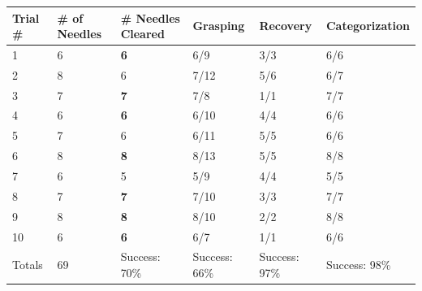 \begin{table}[ht!]\footnotesize
\centering
\label{big-experiment}
\begin{tabular}{l|l|l|l|l|l|}
{Trial \#} & { \# of Needles} & { \# Needles Cleared} & { Grasping} & { Recovery} & { Categorization} \\
\hline
1                               & 6                                    & {\color[HTML]{32CB00} \textbf{6}}         & 6/9                             & 3/3                             & 6/6                                   \\
2                               & 8                                    & 6                                         & 7/12                            & 5/6                             & 6/7                                   \\
3                               & 7                                    & {\color[HTML]{32CB00} \textbf{7}}         & 7/8                             & 1/1                             & 7/7                                   \\
4                               & 6                                    & {\color[HTML]{32CB00} \textbf{6}}         & 6/10                            & 4/4                             & 6/6                                   \\
5                               & 7                                    & 6                                         & 6/11                            & 5/5                             & 6/6                                   \\
6                               & 8                                    & {\color[HTML]{32CB00} \textbf{8}}         & 8/13                            & 5/5                             & 8/8                                   \\
7                               & 6                                    & 5                                         & 5/9                             & 4/4                             & 5/5                                   \\
8                               & 7                                    & {\color[HTML]{32CB00} \textbf{7}}         & 7/10                            & 3/3                             & 7/7                                   \\
9                               & 8                                    & {\color[HTML]{32CB00} \textbf{8}}         & 8/10                            & 2/2                             & 8/8                                   \\
10                              & 6                                    & {\color[HTML]{32CB00} \textbf{6}}         & 6/7                             & 1/1                             & 6/6                                   \\
Totals                          & 69                                   & Success: 70\%                             & Success: 66\%                   & Success: 97\%                   & Success: 98\%                        
\end{tabular}
\end{table}
